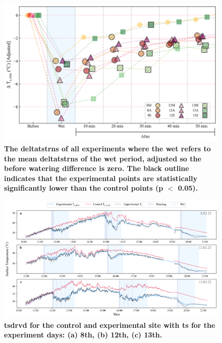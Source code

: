 \documentclass[final,3p,times,authoryear]{elsarticle}
\begin{document}
\begin{figure}
\centering
\includegraphics[trim={0 0 0 0},clip,scale=0.7]{ts_adjusted_NEW.png}
\caption{\bf The \gls{deltatstrns} of all experiments where the wet refers to the mean \gls{deltatstrns} of the wet period, adjusted so the before watering difference is zero. The black outline indicates that the experimental points are statistically significantly lower than the control points (\gls{p} $<$ 0.05).}
 \label{fig:7.16}
\end{figure}



\begin{figure}
\centering
\includegraphics[trim={0 0 0 0},clip,scale=0.5]{daily_ts.png}
\caption{\bf \gls{tsdrvd} for the control and experimental site with \gls{ts} for the experiment days: (a) 8th, (b) 12th, (c) 13th.}
 \label{fig:7.17}
\end{figure}
\end{document}
